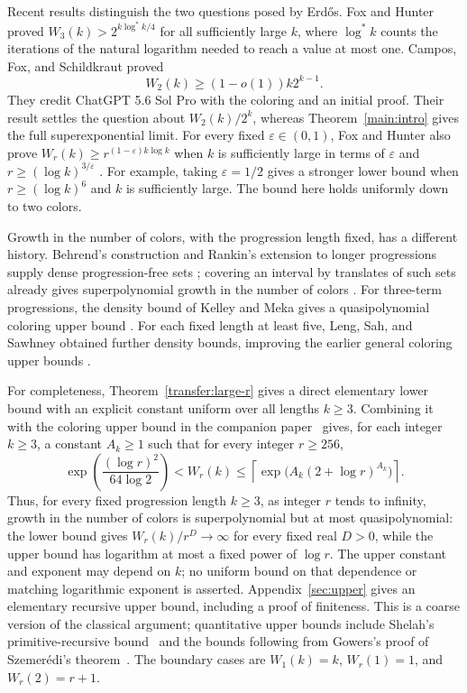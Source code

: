 Recent results distinguish the two questions posed by Erd\H{o}s.
Fox and Hunter \cite[Theorem~1]{foxHunter2026} proved
$W_3(k)>2^{k\log^*k/4}$ for all sufficiently large $k$, where
$\log^*k$ counts the iterations of the natural logarithm needed to
reach a value at most one.
Campos, Fox, and Schildkraut \cite[Theorem~1]{camposFoxSchildkraut2026}
proved
\[
 W_2(k)\ge(1-o(1))k2^{k-1}.
\]
They credit ChatGPT 5.6 Sol Pro with the coloring and an initial proof.
Their result settles the question about $W_2(k)/2^k$, whereas
Theorem~\ref{main:intro} gives the full superexponential limit.
For every fixed $\varepsilon\in(0,1)$, Fox and Hunter also prove
$W_r(k)\ge r^{(1-\varepsilon)k\log k}$ when $k$ is sufficiently
large in terms of $\varepsilon$ and
$r\ge(\log k)^{3/\varepsilon}$ \cite[Theorem~2]{foxHunter2026}.
For example, taking $\varepsilon=1/2$ gives a stronger lower bound
when $r\ge(\log k)^6$ and $k$ is sufficiently large. The bound here
holds uniformly down to two colors.

Growth in the number of colors, with the progression length fixed,
has a different history. Behrend's construction and Rankin's extension
to longer progressions supply dense progression-free sets
\cite{behrend1946,rankin1961}; covering an interval by translates of such
sets already gives superpolynomial growth in the number of colors
\cite[pp.~2--3]{foxHunter2026}. For three-term progressions, the density
bound of Kelley and Meka gives a quasipolynomial coloring upper bound
\cite[Theorems~1.1--1.2]{kelleyMeka2023}. For each fixed length at least
five, Leng, Sah, and Sawhney obtained further density bounds, improving
the earlier general coloring upper bounds
\cite[Theorem~1.1]{lengSahSawhney2024}.

For completeness, Theorem~\ref{transfer:large-r} gives a direct elementary
lower bound with an explicit constant uniform over all lengths $k\ge3$.
Combining it with the coloring upper bound in the
companion paper~\cite[Equation~(1.3)]{openaiArithmeticProgressions2026}
gives, for each integer $k\ge3$, a constant $A_k\ge1$ such that
for every integer $r\ge256$,
\[
 \exp\!\left(\frac{(\log r)^2}{64\log2}\right)
 <W_r(k)\le
 \left\lceil\exp\bigl(A_k(2+\log r)^{A_k}\bigr)\right\rceil.
\]
Thus, for every fixed progression length $k\ge3$, as integer $r$ tends
to infinity, growth in the number of colors is superpolynomial but at
most quasipolynomial: the lower
bound gives $W_r(k)/r^D\to\infty$ for every fixed real $D>0$, while
the upper bound has logarithm at most a fixed power of $\log r$.
The upper constant and exponent may depend on $k$; no uniform bound
on that dependence or matching logarithmic exponent is asserted.
Appendix~\ref{sec:upper} gives an elementary recursive upper bound,
including a proof of finiteness.
This is a coarse version of the classical argument; quantitative upper
bounds include Shelah's primitive-recursive bound~\cite{shelah1988}
and the bounds following from Gowers's proof of Szemer\'edi's
theorem~\cite{gowers2001}.
The boundary cases are $W_1(k)=k$, $W_r(1)=1$, and $W_r(2)=r+1$.

